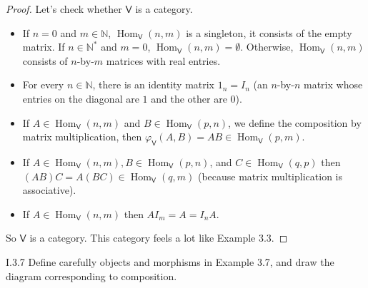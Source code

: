 \begin{proof}
	Let's check whether $\mathsf{V}$ is a category.
	\begin{itemize}
		\item If $n = 0$ and $m\in\mathbb{N}$, $\operatorname{Hom}_{\mathsf{V}}(n, m)$ is a singleton, it consists of the empty matrix. If $n\in\mathbb{N}^{*}$ and $m = 0$, $\operatorname{Hom}_{\mathsf{V}}(n, m) = \emptyset$. Otherwise, $\operatorname{Hom}_{\mathsf{V}}(n, m)$ consists of $n$-by-$m$ matrices with real entries.
		\item For every $n\in\mathbb{N}$, there is an identity matrix $1_{n} = I_{n}$ (an $n$-by-$n$ matrix whose entries on the diagonal are $1$ and the other are $0$).
		\item If $A\in \operatorname{Hom}_{\mathsf{V}}(n, m)$ and $B\in \operatorname{Hom}_{\mathsf{V}}(p, n)$, we define the composition by matrix multiplication, then $\varphi_{\mathsf{V}}(A, B) = AB \in \operatorname{Hom}_{\mathsf{V}}(p, m)$.
		\item If $A\in \operatorname{Hom}_{\mathsf{V}}(n, m), B\in \operatorname{Hom}_{\mathsf{V}}(p, n)$, and $C\in \operatorname{Hom}_{\mathsf{V}}(q, p)$ then $(AB)C = A(BC) \in \operatorname{Hom}_{\mathsf{V}}(q, m)$ (because matrix multiplication is associative).
		\item If $A\in \operatorname{Hom}_{\mathsf{V}}(n, m)$ then $AI_{m} = A = I_{n}A$.
	\end{itemize}

	So $\mathsf{V}$ is a category. This category feels a lot like Example 3.3.
\end{proof}

\begin{exercise}{I.3.7}
	Define carefully objects and morphisms in Example 3.7, and draw the diagram corresponding to composition.
\end{exercise}

